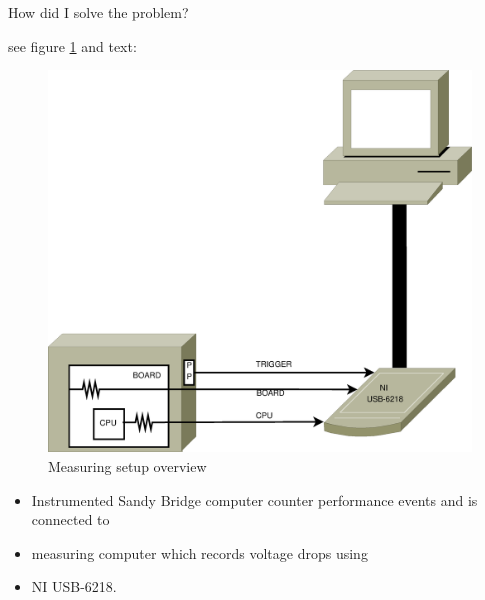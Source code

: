 \label{sec:design}

How did I solve the problem?



\label{sec:big-pic}

see figure \ref{fig:overview} and text:

\begin{figure}
  \centering
    \includegraphics[width=\textwidth]{fig/measuring-overview.eps}
  \caption{Measuring setup overview}
  \label{fig:overview}
\end{figure}

\begin{itemize}

\item Instrumented Sandy Bridge computer counter performance events and is 
      connected to

\item measuring computer which records voltage drops using

\item NI USB-6218.

\end{itemize}

\label{sec:measuring-setup}


